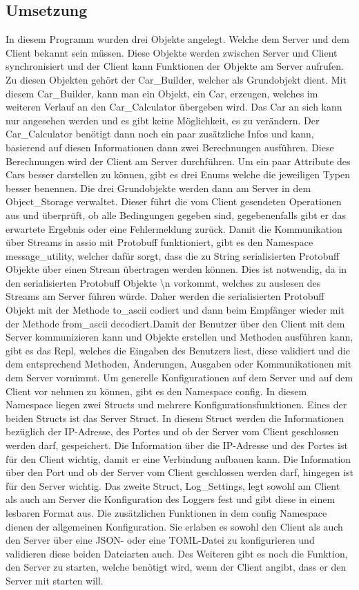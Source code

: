 \documentclass[a4paper,12pt,titlepage]{scrartcl}
\begin{document}
\subsection{Umsetzung}
In diesem Programm wurden drei Objekte angelegt. Welche dem Server und dem Client bekannt sein müssen. Diese Objekte werden zwischen Server und Client synchronisiert und der Client kann Funktionen der Objekte am Server aufrufen. Zu diesen Objekten gehört der Car\_Builder, welcher als Grundobjekt dient. Mit diesem Car\_Builder, kann man ein Objekt, ein Car, erzeugen, welches im weiteren Verlauf an den Car\_Calculator übergeben wird. Das Car an sich kann nur angesehen werden und es gibt keine Möglichkeit, es zu verändern. Der Car\_Calculator benötigt dann noch ein paar zusätzliche Infos und kann, basierend auf diesen Informationen dann zwei Berechnungen ausführen. Diese Berechnungen wird der Client am Server durchführen. Um ein paar Attribute des Cars besser darstellen zu können, gibt es drei Enums welche die jeweiligen Typen besser benennen. Die drei Grundobjekte werden dann am Server in dem Object\_Storage verwaltet. Dieser führt die vom Client gesendeten Operationen aus und überprüft, ob alle Bedingungen gegeben sind, gegebenenfalls gibt er das erwartete Ergebnis oder eine Fehlermeldung zurück. Damit die Kommunikation über Streams in assio mit Protobuff funktioniert, gibt es den Namespace message\_utility, welcher dafür sorgt, dass die zu String serialisierten Protobuff Objekte über einen Stream übertragen werden können. Dies ist notwendig, da in den serialisierten Protobuff Objekte \textbackslash n vorkommt, welches zu auslesen des Streams am Server führen würde. Daher werden die serialisierten Protobuff Objekt mit der Methode to\_ascii codiert und dann beim Empfänger wieder mit der Methode from\_ascii decodiert.Damit der Benutzer über den Client mit dem Server kommunizieren kann und Objekte erstellen und Methoden ausführen kann, gibt es das Repl, welches die Eingaben des Benutzers liest, diese validiert und die dem entsprechend Methoden, Änderungen, Ausgaben oder Kommunikationen mit dem Server vornimmt. Um generelle Konfigurationen auf dem Server und auf dem Client vor nehmen zu können, gibt es den Namespace config. In diesem Namespace liegen zwei Structs und mehrere Konfigurationsfunktionen. Eines der beiden Structs ist das Server Struct. In diesem Struct werden die Informationen bezüglich der IP-Adresse, des Portes und ob der Server vom Client geschlossen werden darf, gespeichert. Die Information über die IP-Adresse und des Portes ist für den Client wichtig, damit er eine Verbindung aufbauen kann. Die Information über den Port und ob der Server vom Client geschlossen werden darf, hingegen ist für den Server wichtig. Das zweite Struct, Log\_Settings, legt sowohl am Client als auch am Server die Konfiguration des Loggers fest und gibt diese in einem lesbaren Format aus. Die zusätzlichen Funktionen in dem config Namespace dienen der allgemeinen Konfiguration. Sie erlaben es sowohl den Client als auch den Server über eine JSON- oder eine TOML-Datei zu konfigurieren und validieren diese beiden Dateiarten auch. Des Weiteren gibt es noch die Funktion, den Server zu starten, welche benötigt wird, wenn der Client angibt, dass er den Server mit starten will.
\end{document}

